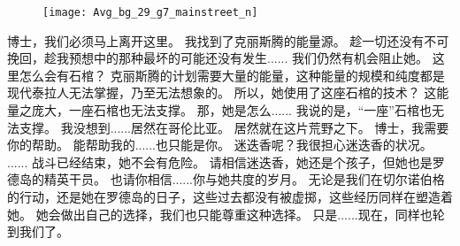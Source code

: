 \documentclass[openany]{book}
\begin{document}
\begin{figure}[h]
    \centering
    \texttt{[image: Avg\_bg\_29\_g7\_mainstreet\_n]}
\end{figure}
\begin{dialogue}
     博士，我们必须马上离开这里。
     我找到了克丽斯腾的能量源。
     趁一切还没有不可挽回，趁我预想中的那种最坏的可能还没有发生......
     我们仍然有机会阻止她。
     这里怎么会有石棺？
     克丽斯腾的计划需要大量的能量，这种能量的规模和纯度都是现代泰拉人无法掌握，乃至无法想象的。
     所以，她使用了这座石棺的技术？
     这能量之庞大，一座石棺也无法支撑。
     那，她是怎么......
     我说的是，“一座”石棺也无法支撑。
     我没想到......居然在哥伦比亚。
     居然就在这片荒野之下。
     博士，我需要你的帮助。
     能帮助我的......也只能是你。
     迷迭香呢？我很担心迷迭香的状况。
     ......
     战斗已经结束，她不会有危险。
     请相信迷迭香，她还是个孩子，但她也是罗德岛的精英干员。
     也请你相信......你与她共度的岁月。
     无论是我们在切尔诺伯格的行动，还是她在罗德岛的日子，这些过去都没有被虚掷，这些经历同样在塑造着她。
     她会做出自己的选择，我们也只能尊重这种选择。
     只是......现在，同样也轮到我们了。
\end{dialogue}
\end{document}
